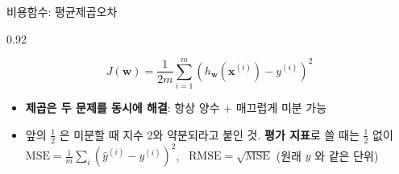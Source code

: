 \begin{frame}{비용함수: 평균제곱오차}
\begin{center}\begin{varwidth}{0.92\textwidth}
  
  \[
  J(\boldsymbol{w}) = \frac{1}{2m}\sum_{i=1}^m \left(h_{\boldsymbol{w}}(\boldsymbol{x}^{(i)}) - y^{(i)}\right)^2
  \]
  
  \begin{itemize}
    
    
    \item \textbf{제곱은 두 문제를 동시에 해결}: 항상 양수 + 매끄럽게
      미분 가능
    \item 앞의 $\frac12$ 은 미분할 때 지수 2와 약분되라고 붙인 것.
      \textbf{평가 지표}로 쓸 때는 $\frac12$ 없이
      $\text{MSE} = \frac{1}{m}\sum_i (\hat y^{(i)} - y^{(i)})^2$,
      \ $\text{RMSE} = \sqrt{\text{MSE}}$ (원래 $y$ 와 같은 단위)
  \end{itemize}
\end{varwidth}\end{center}
\end{frame}
